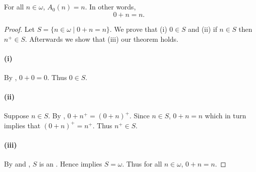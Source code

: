 \documentclass{report}
\begin{document}
\subsection{}%

\begin{lemma}[2]

  For all $n \in \omega$, $A_0(n) = n$.
  In other words, $$0 + n = n.$$

\end{lemma}

\begin{proof}


  Let $S = \{n \in \omega \mid 0 + n = n\}$.
  We prove that (i) $0 \in S$ and (ii) if $n \in S$ then $n^+ \in S$.
  Afterwards we show that (iii) our theorem holds.

  \paragraph{(i)}%

    By , $0 + 0 = 0$.
    Thus $0 \in S$.

  \paragraph{(ii)}%

    Suppose $n \in S$.
    By , $0 + n^+ = (0 + n)^+$.
    Since $n \in S$, $0 + n = n$ which in turn implies that $(0 + n)^+ = n^+$.
    Thus $n^+ \in S$.

  \paragraph{(iii)}%

    By  and
      , $S$ is an
      .
    Hence  implies $S = \omega$.
    Thus for all $n \in \omega$, $0 + n = n$.

\end{proof}

\subsection{}%
\end{document}
